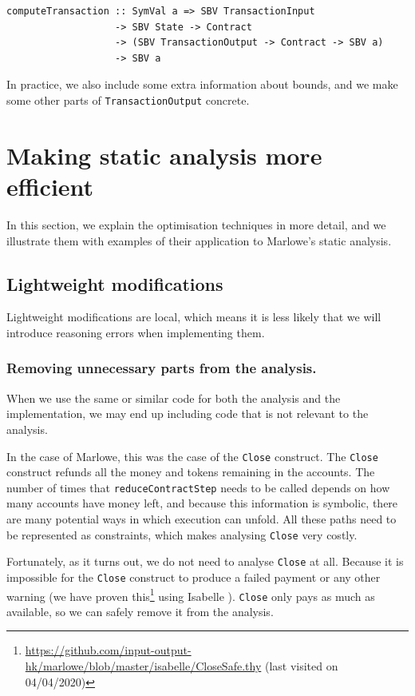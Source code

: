 \documentclass[english,runningheads]{llncs}
\begin{document}
\begin{verbatim}
computeTransaction :: SymVal a => SBV TransactionInput
                   -> SBV State -> Contract
                   -> (SBV TransactionOutput -> Contract -> SBV a)
                   -> SBV a
\end{verbatim}

In practice, we also include some extra information about bounds,
and we make some other parts of \texttt{TransactionOutput} concrete.

\section{Making static analysis more efficient\label{sec:Making-static-analysis-efficient}}

In this section, we explain the optimisation techniques in more detail,
and we illustrate them with examples of their application to Marlowe's static analysis.

\subsection{Lightweight modifications\label{subsec:Lightweight-modifications}}

Lightweight modifications are local, which means it is less likely that we
will introduce reasoning errors when implementing them.

\subsubsection{Removing unnecessary parts from the analysis.}

When we use the same or similar code for both the analysis and the
implementation, we may end up including code that is not relevant
to the analysis.

In the case of Marlowe, this was the case of the \texttt{Close} construct.
The \texttt{Close} construct refunds all the money and tokens remaining
in the accounts. The number of times that \texttt{reduceContractStep} needs
to be called depends on how many accounts have money left, and because
this information is symbolic, there are many potential ways in which execution
can unfold. All these paths need to be represented as constraints, which
makes analysing \texttt{Close} very costly.

Fortunately, as it turns out, we do not need to analyse \texttt{Close} at all.
Because it is impossible for the \texttt{Close} construct to produce a failed payment
or any other warning (we have proven this\footnote{\url{https://github.com/input-output-hk/marlowe/blob/master/isabelle/CloseSafe.thy} (last visited on 04/04/2020)} using Isabelle \cite{nipkow2002isabelle}). \texttt{Close} only pays as much as available,
so we can safely remove it from the analysis.
\end{document}
